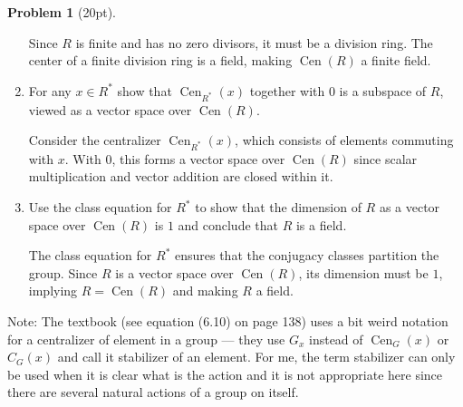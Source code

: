 \documentclass[12pt]{article}
\theoremstyle{definition}
\newtheorem{problem}{Problem}
\DeclareMathOperator{\Cen}{Cen}
\begin{document}
\begin{problem}[20pt]
\begin{enumerate}[label=\arabic*.]
            \begin{solution}
                  Since $R$ is finite and has no zero divisors, it must be a division ring. The center of a finite division ring is a field, making $\Cen(R)$ a finite field.
            \end{solution}

            \item For any $x \in R^*$ show that $\Cen_{R^*}(x)$ together with $0$ is a subspace of $R$,
                  viewed as a vector space over $\Cen(R)$.

            \begin{solution}
                  Consider the centralizer $\Cen_{R^*}(x)$, which consists of elements commuting with $x$. With $0$, this forms a vector space over $\Cen(R)$ since scalar multiplication and vector addition are closed within it.

            \end{solution}

            \item Use the class equation for $R^*$ to show that the dimension of $R$ as a vector space
                  over $\Cen(R)$ is $1$ and conclude that $R$ is a field.

            \begin{solution}
                  The class equation for $R^*$ ensures that the conjugacy classes partition the group. Since $R$ is a vector space over $\Cen(R)$, its dimension must be $1$, implying $R = \Cen(R)$ and making $R$ a field.

            \end{solution}
      \end{enumerate}
      Note: The textbook (see equation (6.10) on page 138) uses a bit weird notation for a centralizer of element
      in a group --- they use $G_x$ instead of $\Cen_G(x)$ or $C_G(x)$ and call it stabilizer of an element. For
      me, the term stabilizer can only be used when it is clear what is the action and it is not appropriate here
      since there are several natural actions of a group on itself.
      
\end{problem}
\end{document}
